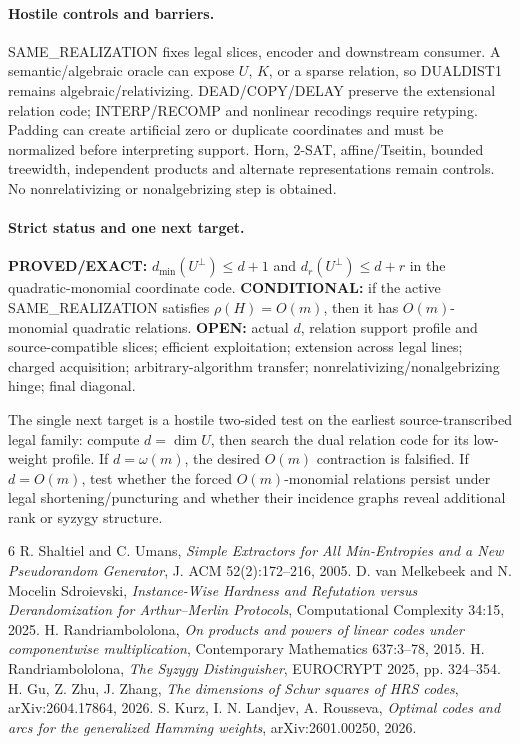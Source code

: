 \documentclass[11pt]{article}
\begin{document}
\paragraph{Hostile controls and barriers.}
SAME\_REALIZATION fixes legal slices, encoder and downstream consumer. A semantic/algebraic oracle can expose \(U\), \(K\), or a sparse relation, so DUALDIST1 remains algebraic/relativizing. DEAD/COPY/DELAY preserve the extensional relation code; INTERP/RECOMP and nonlinear recodings require retyping. Padding can create artificial zero or duplicate coordinates and must be normalized before interpreting support. Horn, 2-SAT, affine/Tseitin, bounded treewidth, independent products and alternate representations remain controls. No nonrelativizing or nonalgebrizing step is obtained.

\paragraph{Strict status and one next target.}
\textbf{PROVED/EXACT:} \(d_{\min}(U^\perp)\le d+1\) and \(d_r(U^\perp)\le d+r\) in the quadratic-monomial coordinate code.
\textbf{CONDITIONAL:} if the active SAME\_REALIZATION satisfies \(\rho(H)=O(m)\), then it has \(O(m)\)-monomial quadratic relations.
\textbf{OPEN:} actual \(d\), relation support profile and source-compatible slices; efficient exploitation; extension across legal lines; charged acquisition; arbitrary-algorithm transfer; nonrelativizing/nonalgebrizing hinge; final diagonal.

The single next target is a hostile two-sided test on the earliest source-transcribed legal family: compute \(d=\dim U\), then search the dual relation code for its low-weight profile. If \(d=\omega(m)\), the desired \(O(m)\) contraction is falsified. If \(d=O(m)\), test whether the forced \(O(m)\)-monomial relations persist under legal shortening/puncturing and whether their incidence graphs reveal additional rank or syzygy structure.

\begin{thebibliography}{6}
 R. Shaltiel and C. Umans, \emph{Simple Extractors for All Min-Entropies and a New Pseudorandom Generator}, J. ACM 52(2):172--216, 2005.
 D. van Melkebeek and N. Mocelin Sdroievski, \emph{Instance-Wise Hardness and Refutation versus Derandomization for Arthur--Merlin Protocols}, Computational Complexity 34:15, 2025.
 H. Randriambololona, \emph{On products and powers of linear codes under componentwise multiplication}, Contemporary Mathematics 637:3--78, 2015.
 H. Randriambololona, \emph{The Syzygy Distinguisher}, EUROCRYPT 2025, pp. 324--354.
 H. Gu, Z. Zhu, J. Zhang, \emph{The dimensions of Schur squares of HRS codes}, arXiv:2604.17864, 2026.
 S. Kurz, I. N. Landjev, A. Rousseva, \emph{Optimal codes and arcs for the generalized Hamming weights}, arXiv:2601.00250, 2026.
\end{thebibliography}
\end{document}
